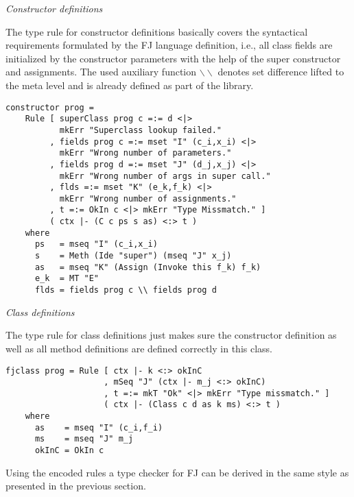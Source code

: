 \bigskip\textit{Constructor definitions}

\smallskip

The type rule for constructor definitions basically covers the
syntactical requirements formulated by the \textsc{FJ} language
definition, i.e., all class fields are initialized by the constructor
parameters with the help of the super constructor and assignments. The
used auxiliary function \texttt{$\backslash\backslash$} denotes set
difference lifted to the meta level and is already defined as part of
the library.

\newpage

\begin{lstlisting}
constructor prog =
    Rule [ superClass prog c =:= d <|>
           mkErr "Superclass lookup failed."
         , fields prog c =:= mset "I" (c_i,x_i) <|>
           mkErr "Wrong number of parameters."
         , fields prog d =:= mset "J" (d_j,x_j) <|>
           mkErr "Wrong number of args in super call."
         , flds =:= mset "K" (e_k,f_k) <|>
           mkErr "Wrong number of assignments."
         , t =:= OkIn c <|> mkErr "Type Missmatch." ]
         ( ctx |- (C c ps s as) <:> t )
    where
      ps   = mseq "I" (c_i,x_i)
      s    = Meth (Ide "super") (mseq "J" x_j)
      as   = mseq "K" (Assign (Invoke this f_k) f_k)
      e_k  = MT "E"
      flds = fields prog c \\ fields prog d
\end{lstlisting}

\bigskip\textit{Class definitions}

\smallskip

The type rule for class definitions just makes sure the constructor
definition as well as all method definitions are defined correctly in
this class.

\begin{lstlisting}
fjclass prog = Rule [ ctx |- k <:> okInC
                    , mSeq "J" (ctx |- m_j <:> okInC)
                    , t =:= mkT "Ok" <|> mkErr "Type missmatch." ]
                    ( ctx |- (Class c d as k ms) <:> t )
    where
      as    = mseq "I" (c_i,f_i)
      ms    = mseq "J" m_j
      okInC = OkIn c
\end{lstlisting}

Using the encoded rules a type checker for \textsc{FJ} can be derived
in the same style as presented in the previous section.